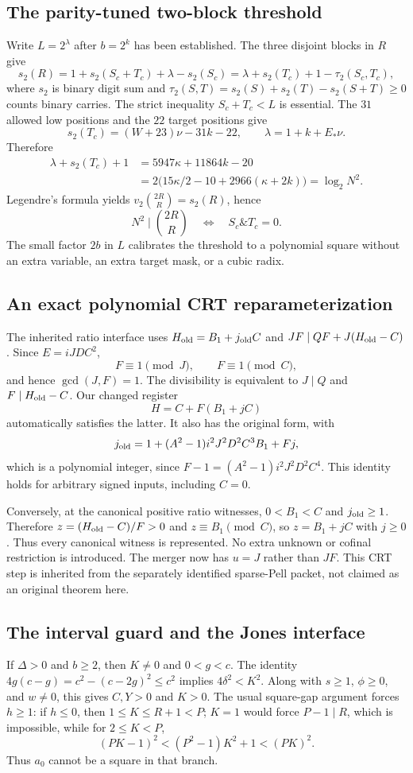 \subsection{The parity-tuned two-block threshold}
Write $L=2^\lambda$ after $b=2^k$ has been established. The three disjoint
blocks in $R$ give
\[
 s_2(R)=1+s_2(S_c+T_c)+\lambda-s_2(S_c)
       =\lambda+s_2(T_c)+1-\tau_2(S_c,T_c),
\]
where $s_2$ is binary digit sum and
$\tau_2(S,T)=s_2(S)+s_2(T)-s_2(S+T)\ge0$ counts binary carries.
The strict inequality $S_c+T_c<L$ is essential.
The $31$ allowed low positions and the $22$ target positions give
\[
 s_2(T_c)=(W+23)\nu-31k-22,\qquad
 \lambda=1+k+E_*\nu.
\]
Therefore
\begin{align*}
 \lambda+s_2(T_c)+1
 &=5947\kappa+11864k-20\\
 &=2\bigl(15\kappa/2-10+2966(\kappa+2k)\bigr)
 =\log_2N^2.
\end{align*}
Legendre's formula yields
$v_2\binom{2R}{R}=s_2(R)$, hence
\[
 N^2\mid\binom{2R}{R}
 \quad\Longleftrightarrow\quad S_c\mathbin{\&}T_c=0.
\]
The small factor $2b$ in $L$ calibrates the threshold to a polynomial square
without an extra variable, an extra target mask, or a cubic radix.

\subsection{An exact polynomial CRT reparameterization}
The inherited ratio interface uses $H_{\rm old}=B_1+j_{\rm old}C$ and
$JF\mid QF+J(H_{\rm old}-C)$. Since $E=iJDC^2$,
\[
 F\equiv1\pmod J,\qquad F\equiv1\pmod C,
\]
and hence $\gcd(J,F)=1$. The divisibility is equivalent to
$J\mid Q$ and $F\mid H_{\rm old}-C$. Our changed register
\[
 H=C+F(B_1+jC)
\]
automatically satisfies the latter. It also has the original form, with
\[
 j_{\rm old}=1+(A^2-1)i^2J^2D^2C^3B_1+Fj,
\]
which is a polynomial integer, since $F-1=(A^2-1)i^2J^2D^2C^4$.
This identity holds for arbitrary signed inputs, including $C=0$.

Conversely, at the canonical positive ratio witnesses, $0<B_1<C$ and
$j_{\rm old}\ge1$. Therefore $z=(H_{\rm old}-C)/F>0$ and
$z\equiv B_1\pmod C$, so $z=B_1+jC$ with $j\ge0$. Thus every
canonical witness is represented. No extra unknown or cofinal restriction is
introduced. The merger now has $u=J$ rather than $JF$. This CRT step is
inherited from the separately identified sparse-Pell packet, not claimed as
an original theorem here.

\subsection{The interval guard and the Jones interface}
If $\Delta>0$ and $b\ge2$, then $K\ne0$ and
$0<g<c$. The identity $4g(c-g)=c^2-(c-2g)^2\le c^2$ implies
$4\delta^2<K^2$. Along with $s\ge1$, $\phi\ge0$, and $w\ne0$, this gives
$C,Y>0$ and $K>0$. The usual square-gap argument forces $h\ge1$:
if $h\le0$, then $1\le K\le R+1<P$; $K=1$ would force $P-1\mid R$,
which is impossible, while for $2\le K<P$,
\[
 (PK-1)^2<(P^2-1)K^2+1<(PK)^2.
\]
Thus $a_0$ cannot be a square in that branch.


